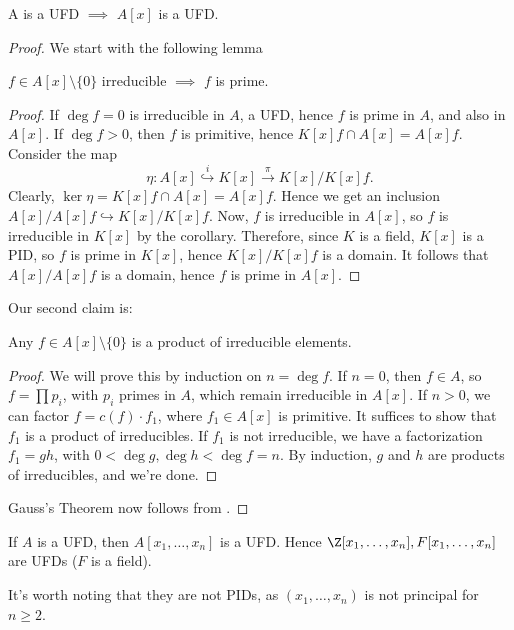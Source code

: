 \begin{thm}
    A is a UFD $\implies$ $A[x]$ is a UFD.
\end{thm}

\begin{proof}
    We start with the following lemma
    \begin{lem}
        $f \in A[x] \setminus \{0\}$ irreducible $\implies$ $f$ is prime.
    \end{lem}
    \begin{proof}
        If $\deg f =0$ is irreducible in $A$, a UFD, hence $f$ is prime in $A$, and also in $A[x]$. If $\deg f>0$, then $f$ is primitive, hence $K[x]f \cap A[x] = A[x] f$. Consider the map
        $$\eta :A[x] \overset{i}{ \hookrightarrow} K[x] \overset{\pi}{ \to} K[x]/K[x]f.$$
        Clearly, $\ker \eta = K[x] f \cap A[x] = A[x]f$. Hence we get an inclusion $A[x] / A[x]f \hookrightarrow K[x] / K[x]f$. Now, $f$ is irreducible in $A[x]$, so $f$ is irreducible in $K[x]$ by the corollary. Therefore, since $K$ is a field, $K[x]$ is a PID, so $f$ is prime in $K[x]$, hence $K[x] /K[x]f$ is a domain. It follows that $A[x]/A[x]f$ is a domain, hence $f$ is prime in $A[x]$.
    \end{proof}

    Our second claim is:

    \begin{lem}
        Any $f \in A[x] \setminus \{0\}$ is a product of irreducible elements.
    \end{lem}

    \begin{proof}
        We will prove this by induction on $n = \deg f$. If $n =0$, then $f \in A$, so $f = \prod p_i$, with $p_i$ primes in $A$, which remain irreducible in $A[x]$. If $n>0$, we can factor $f = c(f) \cdot f_1$, where $f_1 \in A[x]$ is primitive. It suffices to show that $f_1$ is a product of irreducibles. If $f_1$ is not irreducible, we have a factorization $f_1=gh$, with $0 <\deg g, \deg h < \deg f = n$. By induction, $g$ and $h$ are products of irreducibles, and we're done.
    \end{proof}
    Gauss's Theorem now follows from .
\end{proof}

\begin{cor}
    If $A$ is a UFD, then $A[x_1,\dots,x_n]$ is a UFD. Hence $\Z[x_1,\dots,x_n],F[x_1,\dots,x_n]$ are UFDs ($F$ is a field).

    It's worth noting that they are not PIDs, as $(x_1,\dots,x_n)$ is not principal for $n\geq 2$.
\end{cor}

